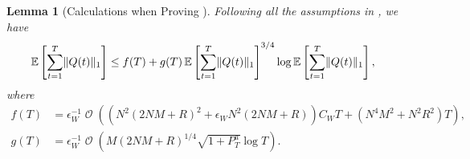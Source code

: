 \documentclass[11pt,fullpage,letterpaper]{article} %
\newtheorem{lemma}[theorem]{Lemma}
\renewcommand{\bm}[1]{#1}%
\renewcommand{\O}{\operatorname{\mathcal O}}
\newcommand{\E}{\operatornamewithlimits{\mathbb{E}}}
\begin{document}
\begin{lemma}[Calculations when Proving ]\label{lem:multi-hop stability tedious calc}
Following all the assumptions in , we have
\begin{align*}
\E\left [\sum_{t=1}^T \lVert \bm Q(t)\rVert_1\right ]&\le f(T) + g(T) \E\left [\sum_{t=1}^T \lVert \bm Q(t)\rVert_1\right ]^{3/4} \log \E \left [ \sum_{t=1}^T \lVert \bm Q(t)\rVert_1\right ],
\end{align*}
where
\begin{align*}
f(T)&=\epsilon_W^{-1}\O\left ((N^2(2NM+R)^2 + \epsilon_W N^2 (2NM+R))C_W T + (N^4 M^2 + N^2 R^2)T\right ),\\
g(T)&=\epsilon_W^{-1} \O\left (M (2NM+R)^{1/4} \sqrt{1+P_T^a} \log T\right ).
\end{align*}
\end{lemma}
\end{document}
